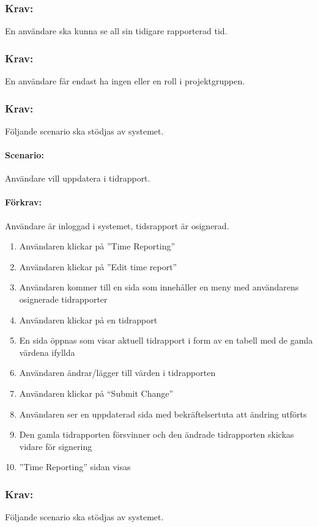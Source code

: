 \documentclass[paper=a4, fontsize=11pt,twoside]{article}
\begin{document}
\subsubsection{Krav:}En användare ska kunna se all sin tidigare rapporterad tid.

\subsubsection{Krav:}En användare får endast ha ingen eller en roll i projektgruppen.

\subsubsection{Krav:} Följande scenario ska stödjas av systemet.
\paragraph{Scenario:}Användare vill uppdatera i tidrapport.
\paragraph{Förkrav:}
Användare är inloggad i systemet, tidsrapport är osignerad.
\begin{enumerate}
\item Användaren klickar på ”Time Reporting”
\item	Användaren klickar på ”Edit time report”
\item	Användaren kommer till en sida som innehåller en meny med användarens osignerade tidrapporter
\item Användaren klickar på en tidrapport
\item	En sida öppnas som visar aktuell tidrapport i form av en tabell med de gamla värdena ifyllda
\item	Användaren ändrar/lägger till värden i tidrapporten
\item	Användaren klickar på “Submit Change”
\item Användaren ser en uppdaterad sida med bekräftelsertuta att ändring utförts
\item	Den gamla tidrapporten försvinner och den ändrade tidrapporten skickas vidare för signering
\item	”Time Reporting” sidan visas
\end{enumerate}

\newpage
\subsubsection{Krav:}Följande scenario ska stödjas av systemet.
\end{document}
